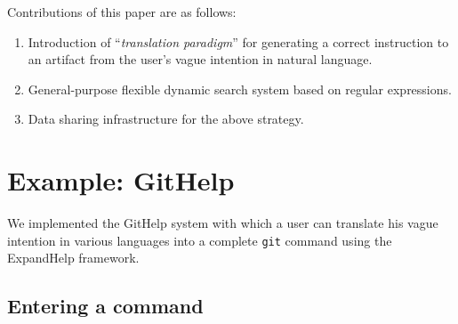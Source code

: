 \documentclass{sigchi}
\def\GH{\textsf{GitHelp}}
\def\EH{\textsf{ExpandHelp}}
\def\GIT{\texttt{git}}
\begin{document}

Contributions of this paper are as follows:

\begin{enumerate}
\item Introduction of ``\textit{translation paradigm}'' for
  generating a correct instruction to an artifact from
  the user's vague intention in natural language.
\item General-purpose flexible dynamic search system based on regular expressions.
\item Data sharing infrastructure for the above strategy.
\end{enumerate}

\section{Example: GitHelp}

We implemented the {\GH} system
with which a user can translate his vague intention in various languages
into a complete {\GIT} command
using the {\EH} framework.

\subsection{Entering a command}
\end{document}
